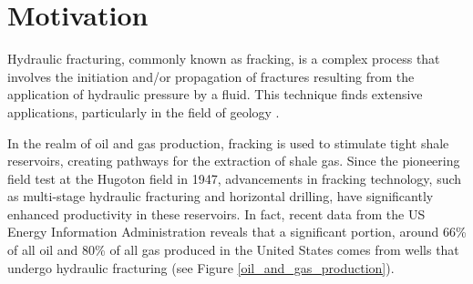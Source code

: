 \section{Motivation}

Hydraulic fracturing, commonly known as fracking, is a complex process that involves the initiation and/or propagation of fractures resulting from the application of hydraulic pressure by a fluid. This technique finds extensive applications, particularly in the field of geology \cite{adachi2007computer}.

In the realm of oil and gas production, fracking is used to stimulate tight shale reservoirs, creating pathways for the extraction of shale gas. Since the pioneering field test at the Hugoton field in 1947, advancements in fracking technology, such as multi-stage hydraulic fracturing and horizontal drilling, have significantly enhanced productivity in these reservoirs. In fact, recent data from the US Energy Information Administration\cite{eia_data_on_gas, eia_data_on_oil} reveals that a significant portion, around 66\% of all oil and 80\% of all gas produced in the United States comes from wells that undergo hydraulic fracturing (see Figure \ref{oil_and_gas_production}).

